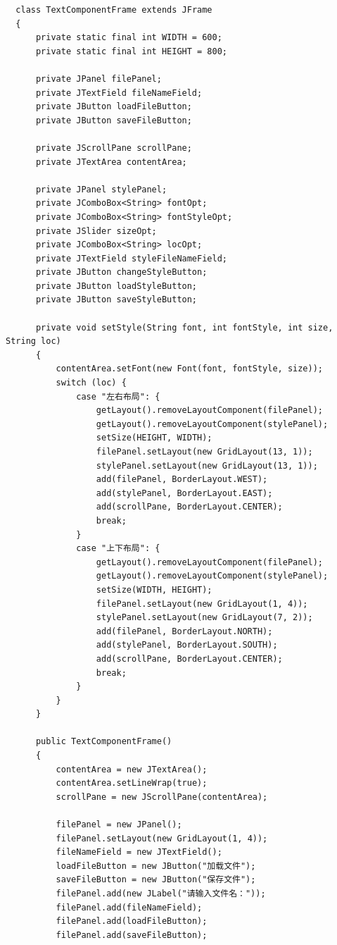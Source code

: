 \documentclass[11pt]{homework}
\begin{document}
\lstset{language=Java}
\begin{lstlisting}
  class TextComponentFrame extends JFrame
  {
      private static final int WIDTH = 600;
      private static final int HEIGHT = 800;
  
      private JPanel filePanel;
      private JTextField fileNameField;
      private JButton loadFileButton;
      private JButton saveFileButton;
  
      private JScrollPane scrollPane;
      private JTextArea contentArea;
  
      private JPanel stylePanel;
      private JComboBox<String> fontOpt;
      private JComboBox<String> fontStyleOpt;
      private JSlider sizeOpt;
      private JComboBox<String> locOpt;
      private JTextField styleFileNameField;
      private JButton changeStyleButton;
      private JButton loadStyleButton;
      private JButton saveStyleButton;
  
      private void setStyle(String font, int fontStyle, int size, String loc)
      {
          contentArea.setFont(new Font(font, fontStyle, size));
          switch (loc) {
              case "左右布局": {
                  getLayout().removeLayoutComponent(filePanel);
                  getLayout().removeLayoutComponent(stylePanel);
                  setSize(HEIGHT, WIDTH);
                  filePanel.setLayout(new GridLayout(13, 1));
                  stylePanel.setLayout(new GridLayout(13, 1));
                  add(filePanel, BorderLayout.WEST);
                  add(stylePanel, BorderLayout.EAST);
                  add(scrollPane, BorderLayout.CENTER);
                  break;
              }
              case "上下布局": {
                  getLayout().removeLayoutComponent(filePanel);
                  getLayout().removeLayoutComponent(stylePanel);
                  setSize(WIDTH, HEIGHT);
                  filePanel.setLayout(new GridLayout(1, 4));
                  stylePanel.setLayout(new GridLayout(7, 2));
                  add(filePanel, BorderLayout.NORTH);
                  add(stylePanel, BorderLayout.SOUTH);
                  add(scrollPane, BorderLayout.CENTER);
                  break;
              }
          }
      }
  
      public TextComponentFrame()
      {
          contentArea = new JTextArea();
          contentArea.setLineWrap(true);
          scrollPane = new JScrollPane(contentArea);
  
          filePanel = new JPanel();
          filePanel.setLayout(new GridLayout(1, 4));
          fileNameField = new JTextField();
          loadFileButton = new JButton("加载文件");
          saveFileButton = new JButton("保存文件");
          filePanel.add(new JLabel("请输入文件名："));
          filePanel.add(fileNameField);
          filePanel.add(loadFileButton);
          filePanel.add(saveFileButton);
  

\end{lstlisting}
\end{document}
